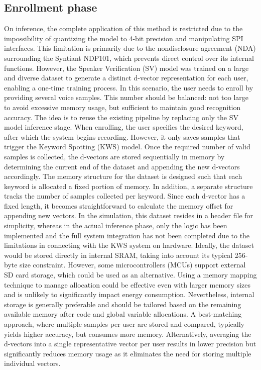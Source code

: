 \subsection{Enrollment phase}
\label{subsec:enrollment} 
On inference, the complete application of this method is restricted due to the impossibility of quantizing the model to 4-bit precision and manipulating SPI interfaces. This limitation is primarily due to the nondisclosure agreement (NDA) surrounding the Syntiant NDP101, which prevents direct control over its internal functions. However, the Speaker Verification (SV) model was trained on a large and diverse dataset to generate a distinct d-vector representation for each user, enabling a one-time training process. In this scenario, the user needs to enroll by providing several voice samples. This number should be balanced: not too large to avoid excessive memory usage, but sufficient to maintain good recognition accuracy. The idea is to reuse the existing pipeline by replacing only the SV model inference stage. When enrolling, the user specifies the desired keyword, after which the system begins recording. However, it only saves samples that trigger the Keyword Spotting (KWS) model. Once the required number of valid samples is collected, the d-vectors are stored sequentially in memory by determining the current end of the dataset and appending the new d-vectors accordingly.
The memory structure for the dataset is designed such that each keyword is allocated a fixed portion of memory. In addition, a separate structure tracks the number of samples collected per keyword. Since each d-vector has a fixed length, it becomes straightforward to calculate the memory offset for appending new vectors. In the simulation, this dataset resides in a header file for simplicity, whereas in the actual inference phase, only the logic has been implemented and the full system integration has not been completed due to the limitations in connecting with the KWS system on hardware. Ideally, the dataset would be stored directly in internal SRAM, taking into account its typical 256-byte size constraint. However, some microcontrollers (MCUs) support external SD card storage, which could be used as an alternative. Using a memory mapping technique to manage allocation could be effective even with larger memory sizes and is unlikely to significantly impact energy consumption. Nevertheless, internal storage is generally preferable and should be tailored based on the remaining available memory after code and global variable allocations. A best-matching approach, where multiple samples per user are stored and compared, typically yields higher accuracy, but consumes more memory. Alternatively, averaging the d-vectors into a single representative vector per user results in lower precision but significantly reduces memory usage as it eliminates the need for storing multiple individual vectors.
